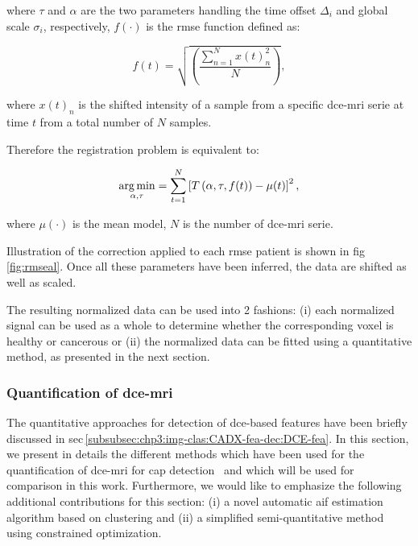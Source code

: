 \noindent where $\tau$ and $\alpha$ are the two parameters handling the time offset $\Delta_i$ and global scale $\sigma_i$, respectively, $f(\cdot)$ is the \ac{rmse} function defined as:

\begin{equation}
  f(t) = \sqrt{ \left( \frac{\sum_{n=1}^{N} x(t)_{n}^2}{N}  \right) },
  \label{eq:rmsd}
\end{equation}

\noindent where $x(t)_n$ is the shifted intensity of a sample from a specific \ac{dce}-\ac{mri} serie at time $t$ from a total number of $N$ samples.

Therefore the registration problem is equivalent to:

\begin{equation}
  \operatorname*{arg\,min}_{\alpha, \tau} = \sum_{t=1}^{N} \left[ T\left(\alpha, \tau, f(t)\right) - \mu(t) \right]^{2} ,
  \label{eq:cost}
\end{equation}

\noindent where $\mu(\cdot)$ is the mean model, $N$ is the number of \ac{dce}-\ac{mri} serie.

Illustration of the correction applied to each \ac{rmse} patient is shown in \acs{fig}\,\ref{fig:rmseal}.
Once all these parameters have been inferred, the data are shifted as well as scaled.

The resulting normalized data can be used into 2 fashions: (i) each normalized signal can be used as a whole to determine whether the corresponding voxel is healthy or cancerous or (ii) the normalized data can be fitted using a quantitative method, as presented in the next section.

\subsubsection{Quantification of \acs*{dce}-\acs*{mri}}\label{subsubsec:chp5:DCE-norm:stateart}

The quantitative approaches for detection of \ac{dce}-based features have been briefly discussed in \acs{sec}\,\ref{subsubsec:chp3:img-clas:CADX-fea-dec:DCE-fea}.
In this section, we present in details the different methods which have been used for the quantification of \ac{dce}-\ac{mri} for \ac{cap} detection~\cite{Lemaitre2015} and which will be used for comparison in this work.
Furthermore, we would like to emphasize the following additional contributions for this section: (i) a novel automatic \ac{aif} estimation algorithm based on clustering and (ii) a simplified semi-quantitative method using constrained optimization.

